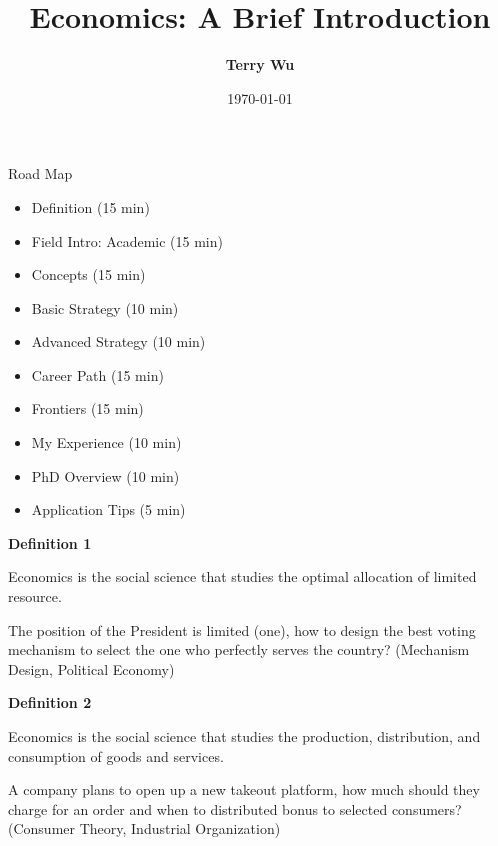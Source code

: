 \documentclass{beamer}
\title[Econ]{\bf  Economics: A Brief Introduction}
\author{\textbf{Terry Wu\vspace{-10pt}}}
\date{\today}
\let\olditem=\item%
\renewcommand{\item}{\olditem \justifying}%
\begin{document}
\begin{frame}
  \titlepage
\end{frame}

\begin{frame}
Road Map
\vspace{10pt}
\begin{itemize}
	\item Definition (15 min)
	\item Field Intro: Academic (15 min)
	\item Concepts (15 min)
	\item Basic Strategy (10 min)
	\item Advanced Strategy (10 min)
	\item Career Path (15 min)
	\item Frontiers (15 min)
	\item My Experience (10 min)
	\item PhD Overview (10 min)
	\item Application Tips (5 min)
\end{itemize}
\end{frame}

\begin{frame}{\bf Definition 1}
\begin{definition}
Economics is the social science that studies the optimal allocation of limited resource.
\end{definition}
\begin{example}
The position of the President is limited (one), how to design the best voting mechanism to select the one who perfectly serves the country? (Mechanism Design, Political Economy)
\end{example}
\end{frame}

\begin{frame}{\bf Definition 2}
\begin{definition}
Economics is the social science that studies the production, distribution, and consumption of goods and services.
\end{definition}
\begin{example}
A company plans to open up a new takeout platform, how much should they charge for an order and when to distributed bonus to selected consumers? (Consumer Theory, Industrial Organization)
\end{example}
\end{frame}
\end{document}
